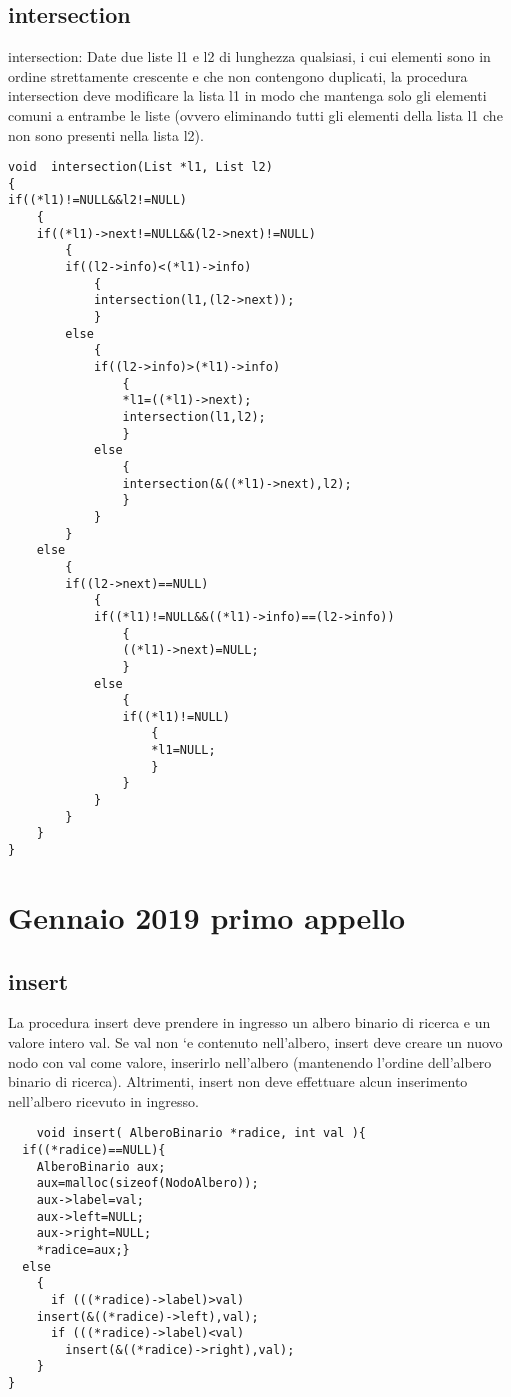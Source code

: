 \documentclass[a4paper,12pt,openany]{book}
\begin{document}
	  \section{intersection}
intersection: Date  due  liste l1 e l2 di  lunghezza  qualsiasi,  i  cui  elementi  sono in  ordine strettamente crescente e che non contengono duplicati, la procedura intersection deve modificare la lista l1 in modo che mantenga solo gli elementi comuni a entrambe le liste (ovvero eliminando tutti gli elementi della lista l1 che non sono presenti nella lista l2).
   \begin{lstlisting}
void  intersection(List *l1, List l2)
{
if((*l1)!=NULL&&l2!=NULL)
	{
	if((*l1)->next!=NULL&&(l2->next)!=NULL)
		{
		if((l2->info)<(*l1)->info)
			{
			intersection(l1,(l2->next));
			}
		else
	 		{
			if((l2->info)>(*l1)->info)
				{
				*l1=((*l1)->next);
				intersection(l1,l2);
				}
			else
				{
				intersection(&((*l1)->next),l2);
				}					
			}
		}
	else
		{
		if((l2->next)==NULL)
			{
			if((*l1)!=NULL&&((*l1)->info)==(l2->info))
				{
				((*l1)->next)=NULL;
				}
			else
				{
				if((*l1)!=NULL)
					{
					*l1=NULL;
					}
				}
			}
		}	
	}
}
	\end{lstlisting}
	\chapter{Gennaio 2019 primo appello}
	\section{insert}
	La procedura insert deve prendere in ingresso un albero binario di ricerca e un valore intero val. Se val non `e contenuto nell’albero, insert deve creare un nuovo nodo con val come valore, inserirlo nell’albero (mantenendo l’ordine dell’albero binario di ricerca). Altrimenti, insert non deve effettuare alcun inserimento nell’albero ricevuto in ingresso.
	\begin{lstlisting}
	void insert( AlberoBinario *radice, int val ){
  if((*radice)==NULL){
    AlberoBinario aux;
    aux=malloc(sizeof(NodoAlbero));
    aux->label=val;
    aux->left=NULL;
    aux->right=NULL;
    *radice=aux;}
  else
    {
      if (((*radice)->label)>val)
	insert(&((*radice)->left),val);
      if (((*radice)->label)<val)
        insert(&((*radice)->right),val);
    }
}


\end{lstlisting}
\end{document}
